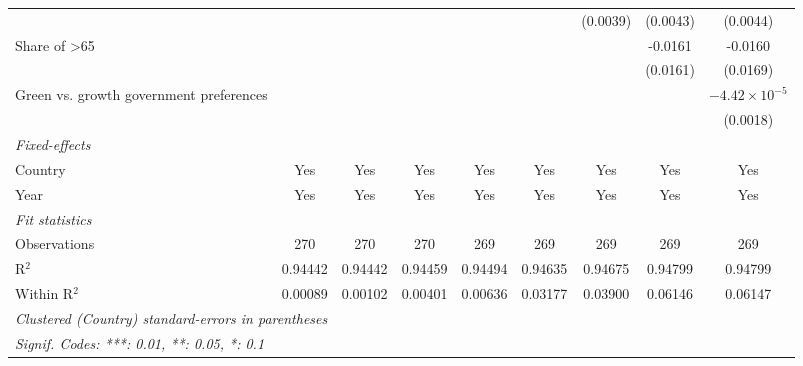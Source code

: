 \begin{table}[htbp]
\begin{tabular}{lcccccccc}
                                                     &          &          &          &          &          & (0.0039) & (0.0043) & (0.0044)\\   
      Share of >65                                   &          &          &          &          &          &          & -0.0161  & -0.0160\\   
                                                     &          &          &          &          &          &          & (0.0161) & (0.0169)\\   
      Green vs. growth government preferences        &          &          &          &          &          &          &          & $-4.42\times 10^{-5}$\\    
                                                     &          &          &          &          &          &          &          & (0.0018)\\   
      \midrule
      \emph{Fixed-effects}\\
      Country                                        & Yes      & Yes      & Yes      & Yes      & Yes      & Yes      & Yes      & Yes\\  
      Year                                           & Yes      & Yes      & Yes      & Yes      & Yes      & Yes      & Yes      & Yes\\  
      \midrule
      \emph{Fit statistics}\\
      Observations                                   & 270      & 270      & 270      & 269      & 269      & 269      & 269      & 269\\  
      R$^2$                                          & 0.94442  & 0.94442  & 0.94459  & 0.94494  & 0.94635  & 0.94675  & 0.94799  & 0.94799\\  
      Within R$^2$                                   & 0.00089  & 0.00102  & 0.00401  & 0.00636  & 0.03177  & 0.03900  & 0.06146  & 0.06147\\  
      \midrule \midrule
      \multicolumn{9}{l}{\emph{Clustered (Country) standard-errors in parentheses}}\\
      \multicolumn{9}{l}{\emph{Signif. Codes: ***: 0.01, **: 0.05, *: 0.1}}\\
   \end{tabular}
\end{table}


